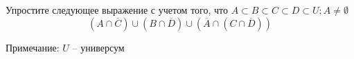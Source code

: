 \question
Упростите следующее выражение с учетом того, что $A\subset B \subset C \subset D \subset U; A \neq \emptyset$
\begin{equation*}
	(A \cap  \overline{C}) \cup (B \cap \overline{D}) \cup  (\overline{A} \cap (C \cap  \overline{D}))
\end{equation*}

Примечание: $U$ -- универсум 